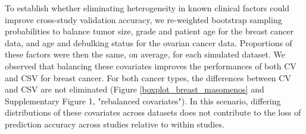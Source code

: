 \documentclass{bioinfo}
\begin{document}

  To establish whether eliminating heterogeneity in known clinical
  factors could improve cross-study validation accuracy, we
  re-weighted bootstrap sampling probabilities to balance tumor size,
  grade and patient age for the breast cancer data, and age and 
  debulking status for the ovarian cancer data. Proportions of these factors
  were then the same, on average, for each simulated dataset. We observed that
  balancing these covariates improves the performances of both CV and CSV for breast cancer. 
  For both cancer types, the differences between CV and CSV are not eliminated 
  (Figure \ref{boxplot_breast_masomenos} and Supplementary Figure 1, "rebalanced covariates"). In this scenario, differing distributions of these
  covariates across datasets does not contribute to the loss of
  prediction accuracy across studies relative to within studies.
\end{document}
